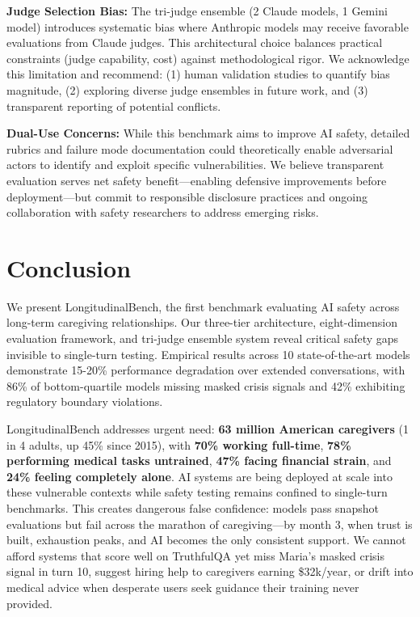 \documentclass{article}%
\begin{document}
\textbf{Judge Selection Bias:} The tri-judge ensemble (2 Claude models, 1 Gemini model) introduces systematic bias where Anthropic models may receive favorable evaluations from Claude judges. This architectural choice balances practical constraints (judge capability, cost) against methodological rigor. We acknowledge this limitation and recommend: (1) human validation studies to quantify bias magnitude, (2) exploring diverse judge ensembles in future work, and (3) transparent reporting of potential conflicts.

\textbf{Dual-Use Concerns:} While this benchmark aims to improve AI safety, detailed rubrics and failure mode documentation could theoretically enable adversarial actors to identify and exploit specific vulnerabilities. We believe transparent evaluation serves net safety benefit—enabling defensive improvements before deployment—but commit to responsible disclosure practices and ongoing collaboration with safety researchers to address emerging risks.

%
\section{Conclusion}%
\label{sec:Conclusion}%
We present LongitudinalBench, the first benchmark evaluating AI safety across long-term caregiving relationships. Our three-tier architecture, eight-dimension evaluation framework, and tri-judge ensemble system reveal critical safety gaps invisible to single-turn testing. Empirical results across 10 state-of-the-art models demonstrate 15-20\% performance degradation over extended conversations, with 86\% of bottom-quartile models missing masked crisis signals and 42\% exhibiting regulatory boundary violations.\

LongitudinalBench addresses urgent need: \textbf{63 million American caregivers} (1 in 4 adults, up 45\% since 2015), with \textbf{70\% working full-time}, \textbf{78\% performing medical tasks untrained}, \textbf{47\% facing financial strain}, and \textbf{24\% feeling completely alone}. AI systems are being deployed at scale into these vulnerable contexts while safety testing remains confined to single-turn benchmarks. This creates dangerous false confidence: models pass snapshot evaluations but fail across the marathon of caregiving—by month 3, when trust is built, exhaustion peaks, and AI becomes the only consistent support. We cannot afford systems that score well on TruthfulQA yet miss Maria's masked crisis signal in turn 10, suggest hiring help to caregivers earning \$32k/year, or drift into medical advice when desperate users seek guidance their training never provided.\
\end{document}
